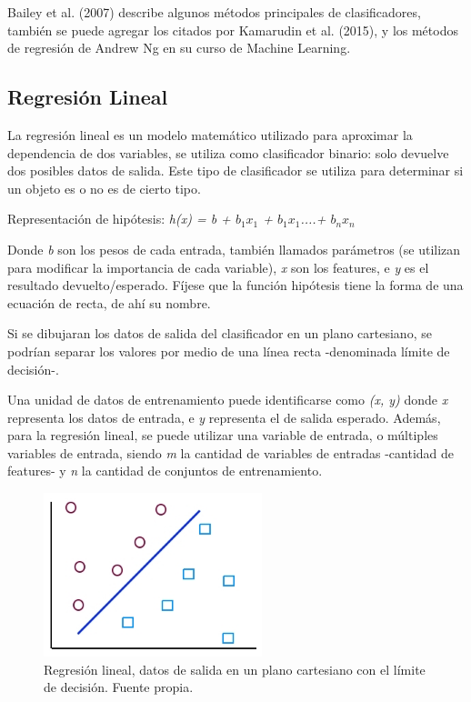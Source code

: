 \documentclass[a4paper,12pt,oneside,spanish]{book}
\begin{document}
Bailey et al. (2007) describe algunos métodos principales de clasificadores, también se puede agregar los citados por Kamarudin et al. (2015), y los métodos de regresión de Andrew Ng en su curso de Machine Learning. \par

\subsection{Regresión Lineal}

La regresión lineal es un modelo matemático utilizado para aproximar la dependencia de dos variables, se utiliza como clasificador binario: solo devuelve dos posibles datos de salida. Este tipo de clasificador se utiliza para determinar si un objeto es o no es de cierto tipo. \par
Representación de hipótesis: \textit{h(x) = b + $b_1$$x_1$ + $b_1$$x_1$....+ $b_n$$x_n$}
	
Donde \textit{b} son los pesos de cada entrada, también llamados parámetros (se utilizan para modificar la importancia de cada variable), \textit{x} son los features, e \textit{y} es el resultado devuelto/esperado. Fíjese que la función hipótesis tiene la forma de una ecuación de recta, de ahí su nombre. \par


Si se dibujaran los datos de salida del clasificador en un plano cartesiano, se podrían separar los valores por medio de una línea recta -denominada límite de decisión-. \par

Una unidad de datos de entrenamiento puede identificarse como \textit{(x, y)} donde \textit{x} representa los datos de entrada, e \textit{y} representa el de salida esperado. Además, para la regresión lineal, se puede utilizar una variable de entrada, o múltiples variables de entrada, siendo \textit{m} la cantidad de variables de entradas -cantidad de features- y \textit{n} la cantidad de conjuntos de entrenamiento.  \par

\begin{figure}[h!]
	\includegraphics[width=180pt]{Imagenes/regresion1.jpg}
	\centering
	\caption{Regresión lineal, datos de salida en un plano cartesiano con el límite de decisión. Fuente propia.}
	\label{fig:regresion1}
\end{figure}
\end{document}
